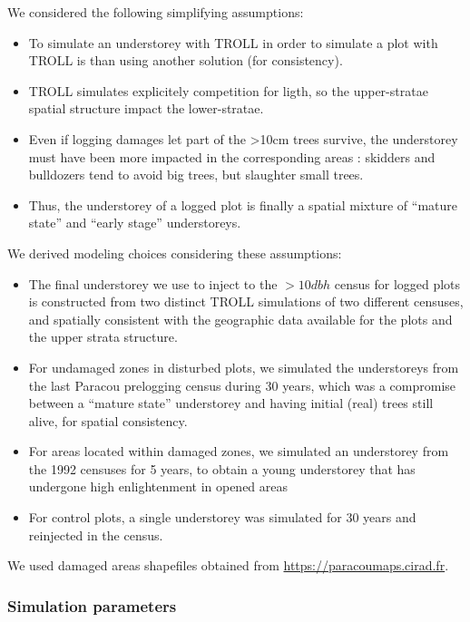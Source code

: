 \documentclass[12pt,]{article}
\providecommand{\tightlist}{%
\setlength{\itemsep}{0pt}\setlength{\parskip}{0pt}}
\theoremstyle{definition}
\theoremstyle{definition}
\theoremstyle{definition}
\theoremstyle{remark}
\begin{document}
We considered the following simplifying assumptions:

\begin{itemize}
\tightlist
\item
  To simulate an understorey with TROLL in order to simulate a plot with
  TROLL is than using another solution (for consistency).
\item
  TROLL simulates explicitely competition for ligth, so the
  upper-stratae spatial structure impact the lower-stratae.
\item
  Even if logging damages let part of the \textgreater{}10cm trees
  survive, the understorey must have been more impacted in the
  corresponding areas : skidders and bulldozers tend to avoid big trees,
  but slaughter small trees.
\item
  Thus, the understorey of a logged plot is finally a spatial mixture of
  ``mature state'' and ``early stage'' understoreys.
\end{itemize}

We derived modeling choices considering these assumptions:

\begin{itemize}
\item
  The final understorey we use to inject to the \(>10dbh\) census for
  logged plots is constructed from two distinct TROLL simulations of two
  different censuses, and spatially consistent with the geographic data
  available for the plots and the upper strata structure.
\item
  For undamaged zones in disturbed plots, we simulated the understoreys
  from the last Paracou prelogging census during 30 years, which was a
  compromise between a ``mature state'' understorey and having initial
  (real) trees still alive, for spatial consistency.
\item
  For areas located within damaged zones, we simulated an understorey
  from the 1992 censuses for 5 years, to obtain a young understorey that
  has undergone high enlightenment in opened areas
\item
  For control plots, a single understorey was simulated for 30 years and
  reinjected in the census.
\end{itemize}

We used damaged areas shapefiles obtained from
\url{https://paracoumaps.cirad.fr}.

\subsubsection{Simulation parameters}\label{simulation-parameters}
\end{document}
